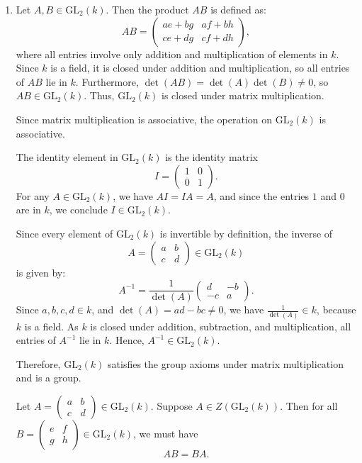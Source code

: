 \documentclass[12pt]{article}
\begin{document}
\begin{enumerate}[label=(\arabic*)] 

\item 
Let \( A, B \in \mathrm{GL}_2(k) \). Then the product \( AB \) is defined as:
\[
AB = \begin{pmatrix}
ae + bg & af + bh \\
ce + dg & cf + dh
\end{pmatrix},
\]
where all entries involve only addition and multiplication of elements in \( k \). Since \( k \) is a field, it is closed under addition and multiplication, so all entries of \( AB \) lie in \( k \). Furthermore, \( \det(AB) = \det(A)\det(B) \neq 0 \), so \( AB \in \mathrm{GL}_2(k) \). Thus, \( \mathrm{GL}_2(k) \) is closed under matrix multiplication.

Since matrix multiplication is associative, the operation on \( \mathrm{GL}_2(k) \) is associative.

The identity element in \( \mathrm{GL}_2(k) \) is the identity matrix
\[
I = \begin{pmatrix} 1 & 0 \\ 0 & 1 \end{pmatrix}.
\]
For any \( A \in \mathrm{GL}_2(k) \), we have \( AI = IA = A \), and since the entries \( 1 \) and \( 0 \) are in \( k \), we conclude \( I \in \mathrm{GL}_2(k) \).

Since every element of \( \mathrm{GL}_2(k) \) is invertible by definition, the inverse of
\[
A = \begin{pmatrix} a & b \\ c & d \end{pmatrix} \in \mathrm{GL}_2(k)
\]
is given by:
\[
A^{-1} = \frac{1}{\det(A)} \begin{pmatrix} d & -b \\ -c & a \end{pmatrix}.
\]
Since \( a, b, c, d \in k \), and \( \det(A) = ad - bc \neq 0 \), we have \( \frac{1}{\det(A)} \in k \), because \( k \) is a field. As \( k \) is closed under addition, subtraction, and multiplication, all entries of \( A^{-1} \) lie in \( k \). Hence, \( A^{-1} \in \mathrm{GL}_2(k) \).

Therefore, \( \mathrm{GL}_2(k) \) satisfies the group axioms under matrix multiplication and is a group.

Let \( A = \begin{pmatrix} a & b \\ c & d \end{pmatrix} \in \mathrm{GL}_2(k) \). Suppose \( A \in Z(\mathrm{GL}_2(k)) \). Then for all \( B = \begin{pmatrix} e & f \\ g & h \end{pmatrix} \in \mathrm{GL}_2(k) \), we must have
\[
AB = BA.
\]


\end{enumerate}
\end{document}
